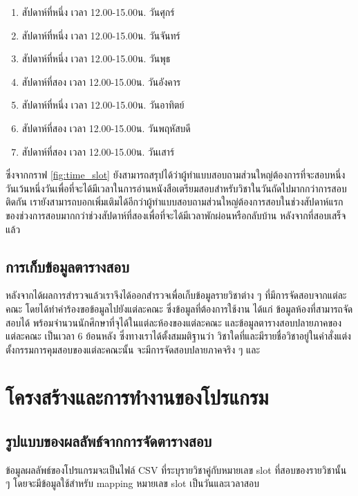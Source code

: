 \begin{enumerate}
  \item สัปดาห์ที่หนึ่ง เวลา 12.00-15.00น. วันศุกร์ 
  \item สัปดาห์ที่หนึ่ง เวลา 12.00-15.00น. วันจันทร์
  \item สัปดาห์ที่หนึ่ง เวลา 12.00-15.00น. วันพุธ
  \item สัปดาห์ที่สอง เวลา 12.00-15.00น. วันอังคาร
  \item สัปดาห์ที่หนึ่ง เวลา 12.00-15.00น. วันอาทิตย์
  \item สัปดาห์ที่สอง เวลา 12.00-15.00น. วันพฤหัสบดี
  \item สัปดาห์ที่สอง เวลา 12.00-15.00น. วันเสาร์
\end{enumerate}

ซึ่งจากกราฟ \ref{fig:time_slot} ยังสามารถสรุปได้ว่าผู้ทำแบบสอบถามส่วนใหญ่ต้องการที่จะสอบหนึ่งวันเว้นหนึ่งวันเพื่อที่จะได้มีเวลาในการอ่านหนังสือเตรียมสอบสำหรับวิชาในวันถัดไปมากกว่าการสอบติดกัน 
เรายังสามารถบอกเพิ่มเติมได้อีกว่าผู้ทำแบบสอบถามส่วนใหญ่ต้องการสอบในช่วงสัปดาห์แรกของช่วงการสอบมากกว่าช่วงสัปดาห์ที่สองเพื่อที่จะได้มีเวลาพักผ่อนหรือกลับบ้าน หลังจากที่สอบเสร็จแล้ว

\subsection{การเก็บข้อมูลตารางสอบ}
หลังจากได้ผลการสำรวจแล้วเราจึงได้ออกสำรวจเพื่อเก็บข้อมูลรายวิชาต่าง ๆ ที่มีการจัดสอบจากแต่ละคณะ โดยได้ทำคำร้องขอข้อมูลไปยังแต่ละคณะ ซึ่งข้อมูลที่ต้องการใช้งาน ได้แก่ ข้อมูลห้องที่สามารถจัดสอบได้ พร้อมจำนวนนักศึกษาที่จุได้ในแต่ละห้องของแต่ละคณะ และข้อมูลตารางสอบปลายภาคของแต่ละคณะ เป็นเวลา 6 ย้อนหลัง ซึ่งทางเราได้ตั้งสมมติฐานว่า วิชาใดที่และมีรายชื่อวิชาอยู่ในคำสั่งแต่งตั้งกรรมการคุมสอบของแต่ละคณะนั้น จะมีการจัดสอบปลายภาคจริง ๆ และ

\section{โครงสร้างและการทำงานของโปรแกรม}

\subsection{รูปแบบของผลลัพธ์จากการจัดตารางสอบ}
ข้อมูลผลลัพธ์ของโปรแกรมจะเป็นไฟล์ CSV ที่ระบุรายวิชาคู่กับหมายเลข slot ที่สอบของรายวิชานั้น ๆ โดยจะมีข้อมูลใช้สำหรับ mapping หมายเลข slot เป็นวันและเวลาสอบ

